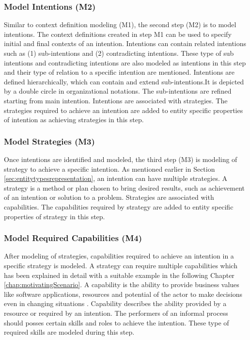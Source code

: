 \subsubsection{Model Intentions (M2)}  
Similar to context definition modeling (M1), the second step (M2) is to model intentions. The context definitions created in step M1 can be used to specify initial and final contexts of an intention. Intentions can contain related intentions such as (1) sub-intentions and (2) contradicting intentions. These type of sub intentions and contradicting intentions are also modeled as intentions in this step and their type of relation to a specific intention are mentioned. Intentions are defined hierarchically, which can contain and extend sub-intentions.It is depicted by a double circle in organizational notations. The sub-intentions are refined starting from main intention. Intentions are associated with strategies. The strategies required to achieve an intention are added to entity specific properties of intention as achieving strategies in this step.

\subsubsection{Model Strategies (M3)}  
Once intentions are identified and modeled, the third step (M3) is modeling of strategy to achieve a specific intention. As mentioned earlier in Section \ref{sec:entitytypesrepresentation}, an intention can have multiple strategies.  A  strategy is a method or plan chosen to bring  desired results, such as achievement of an intention or solution to a problem. Strategies are associated with capabilities. The capabilities required by strategy are added to entity specific properties of strategy in this step. 

\subsubsection{Model Required Capabilities (M4)}  
After modeling of strategies, capabilities required to achieve an intention in a specific strategy is modeled. A strategy can require multiple capabilities which has been explained in detail with a suitable example in the following Chapter \ref{chap:motivatingScenario}. 
A capability is the ability to provide business values like software applications, resources and potential of the actor to make decisions even in changing situations \cite{Stirna2012}. Capability describes the ability provided by a resource or required by an intention. The performers of an informal process should posses certain skills and roles to achieve the intention. These type of required skills are modeled during this step.

